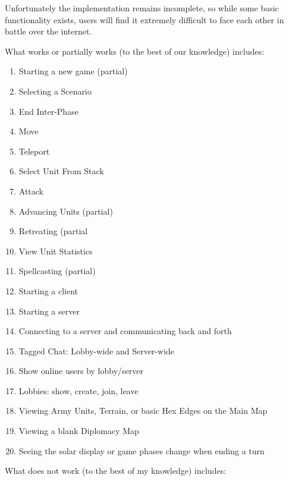 \documentclass[12pt,a4paper]{article}
\begin{document}
Unfortunately the implementation remains incomplete, so while some basic
functionality exists, users will find it extremely difficult to face each other in battle
over the internet.

What works or partially works (to the best of our knowledge) includes:

\begin{enumerate}
\item{Starting a new game (partial)}
\item{Selecting a Scenario}
\item{End Inter-Phase}
\item{Move}
\item{Teleport}
\item{Select Unit From Stack}
\item{Attack}
\item{Advancing Units (partial)}
\item{Retreating (partial}
\item{View Unit Statistics}
\item{Spellcasting (partial)}
\item{Starting a client}
\item{Starting a server}
\item{Connecting to a server and communicating back and forth}
\item{Tagged Chat: Lobby-wide and Server-wide}
\item{Show online users by lobby/server}
\item{Lobbies: show, create, join, leave}
\item{Viewing Army Units, Terrain, or basic Hex Edges on the Main Map}
\item{Viewing a blank Diplomacy Map}
\item{Seeing the solar display or game phases change when ending a turn}
\end{enumerate}

What does not work (to the best of my knowledge) includes:
\end{document}

